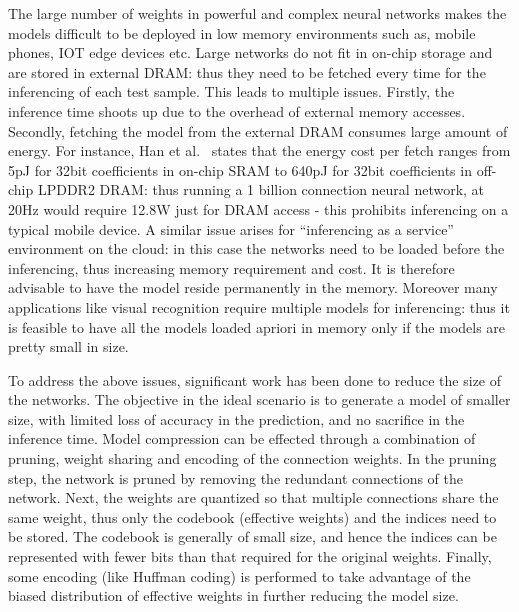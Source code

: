 The large number of weights in powerful and complex neural networks makes the models difficult to be deployed 
in low memory environments such as, mobile phones, IOT edge devices etc.
Large networks do not fit in on-chip storage  and are stored in external DRAM: thus they 
need to be  fetched every time for the inferencing of each test sample. This leads to multiple issues. Firstly, the inference time shoots up due to the overhead of external memory accesses. Secondly,
fetching the model from the external DRAM consumes large amount of energy. For instance,  Han et al.~\cite{HanMD15}
states that the energy cost per  fetch ranges from 5pJ for 32bit coefficients in on-chip SRAM to 640pJ for 32bit coefficients in off-chip
LPDDR2 DRAM:  thus running a 1 billion connection neural network,  at 20Hz would require  12.8W just for DRAM access - 
this prohibits inferencing on a typical mobile device.
A similar issue arises for ``inferencing as a service'' environment on the cloud: 
in this case the networks need to be loaded before the inferencing, thus increasing 
memory requirement and cost. It is therefore advisable to have the model reside permanently in the memory. Moreover many applications like visual recognition 
require multiple models for inferencing: thus it is feasible to have all the models loaded
apriori in memory only if the models are pretty small in size.

To address the above issues, significant work has been done to reduce the size of the networks.  
The objective in the ideal scenario is to generate a model of smaller size, with limited loss of accuracy in the prediction, and no sacrifice in the inference time.
Model compression can be  effected  through a combination of pruning, weight sharing and encoding of the connection weights.
In the pruning step,  the network is pruned  by removing the redundant connections of the network.
Next, the weights are quantized so that multiple connections share the same weight, thus only the codebook (effective weights) and the indices need to be stored. 
The codebook is generally of small size, and hence the indices can be represented with fewer bits than that required for the original weights.
Finally, some encoding (like Huffman coding) is performed to take advantage of the biased distribution of effective weights in further reducing the model size.

